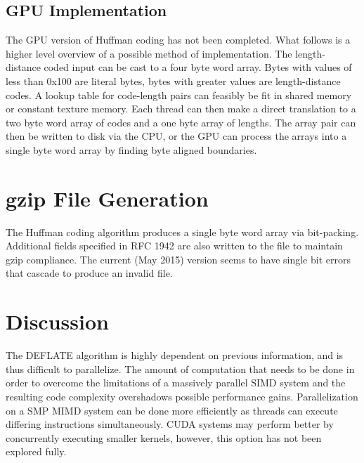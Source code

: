 \documentclass[twoside]{article}
\begin{document}
\begin{multicols}{2}
\subsection{GPU Implementation}

The GPU version of Huffman coding has not been completed. What follows is a higher level overview of a possible method of implementation. The length-distance coded input can be cast to a four byte word array. Bytes with values of less than 0x100 are literal bytes, bytes with greater values are length-distance codes. A lookup table for code-length pairs can feasibly be fit in shared memory or constant texture memory. Each thread can then make a direct translation to a two byte word array of codes and a one byte array of lengths. The array pair can then be written to disk via the CPU, or the GPU can process the arrays into a single byte word array by finding byte aligned boundaries.


\section{gzip File Generation}

The Huffman coding algorithm produces a single byte word array via bit-packing. Additional fields specified in RFC 1942\cite{RFC1952} are also written to the file to maintain gzip compliance. The current (May 2015) version seems to have single bit errors that cascade to produce an invalid file.



\section{Discussion}

The DEFLATE algorithm is highly dependent on previous information, and is thus difficult to parallelize. The amount of computation that needs to be done in order to overcome the limitations of a massively parallel SIMD system and the resulting code complexity overshadows possible performance gains. Parallelization on a SMP MIMD system can be done more efficiently as threads can execute differing instructions simultaneously. CUDA systems may perform better by concurrently executing smaller kernels, however, this option has not been explored fully.




\printbibliography


\end{multicols}
\end{document}
